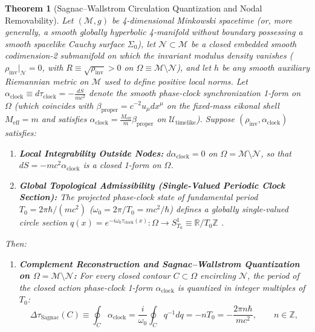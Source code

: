 \documentclass[11pt, a4paper]{article}
\newtheorem{theorem}{Theorem}[section]
\theoremstyle{definition}
\begin{document}
\begin{theorem}[Sagnac--Wallstrom Circulation Quantization and Nodal Removability]
\label{thm:wallstrom}
Let $(\mathcal{M}, g)$ be 4-dimensional Minkowski spacetime (or, more generally, a smooth globally hyperbolic 4-manifold without boundary possessing a smooth spacelike Cauchy surface $\Sigma_0$), let $\mathcal{N} \subset \mathcal{M}$ be a closed embedded smooth codimension-2 submanifold on which the invariant modulus density vanishes ($\rho_{\text{inv}}|_{\mathcal{N}} = 0$, with $R \equiv \sqrt{\rho_{\text{inv}}} > 0$ on $\Omega \equiv \mathcal{M}\setminus\mathcal{N}$), and let $h$ be any smooth auxiliary Riemannian metric on $\mathcal{M}$ used to define positive local norms. Let $\alpha_{\text{clock}} \equiv d\tau_{\text{clock}} = -\frac{dS}{mc^2}$ denote the smooth phase-clock synchronization 1-form on $\Omega$ (which coincides with $\beta_{\text{proper}} = c^{-2}u_\mu dx^\mu$ on the fixed-mass eikonal shell $M_{\text{eff}} = m$ and satisfies $\alpha_{\text{clock}} = \frac{M_{\text{eff}}}{m}\beta_{\text{proper}}$ on $\mathcal{U}_{\text{timelike}}$). Suppose $(\rho_{\text{inv}}, \alpha_{\text{clock}})$ satisfies:
\begin{enumerate}[label=(\roman*)]
    \item \textbf{Local Integrability Outside Nodes:} $d\alpha_{\text{clock}} = 0$ on $\Omega = \mathcal{M}\setminus\mathcal{N}$, so that $dS = -mc^2 \alpha_{\text{clock}}$ is a closed 1-form on $\Omega$.
    \item \textbf{Global Topological Admissibility (Single-Valued Periodic Clock Section):} The projected phase-clock state of fundamental period $T_0 = 2\pi\hbar / (mc^2)$ ($\omega_0 = 2\pi/T_0 = mc^2/\hbar$) defines a globally single-valued circle section $q(x) = e^{-i\omega_0\tau_{\text{clock}}(x)}: \Omega \to S^1_{T_0} \equiv \mathbb{R} / T_0\mathbb{Z}$ \cite{Wallstrom1994, Khesin2026}.
\end{enumerate}
Then:
\begin{enumerate}[label=(\alph*)]
    \item \textbf{Complement Reconstruction and Sagnac--Wallstrom Quantization on $\Omega = \mathcal{M}\setminus\mathcal{N}$:} For every closed contour $C \subset \Omega$ encircling $\mathcal{N}$, the period of the closed action phase-clock 1-form $\alpha_{\text{clock}}$ is quantized in integer multiples of $T_0$:
    \begin{equation}
    \label{eq:sagnac_quant}
    \Delta \tau_{\text{Sagnac}}(C) \equiv \oint_C \alpha_{\text{clock}} = \frac{i}{\omega_0}\oint_C q^{-1}dq = -n T_0 = -\frac{2\pi n \hbar}{mc^2}, \qquad n \in \mathbb{Z},

\end{equation}
\end{enumerate}
\end{theorem}
\end{document}
